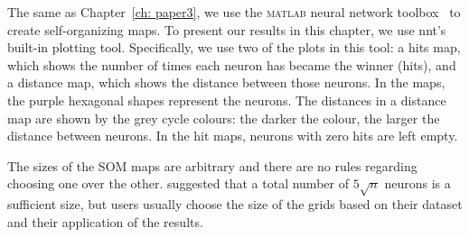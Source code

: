      The same as Chapter~\ref{ch: paper3}, we use the \textsc{matlab} neural network toolbox~\citep[NNT,][]{matlabtolbox} to create self-organizing maps.
     To present our results in this chapter, we use {\sc nnt}'s built-in plotting tool.
     Specifically, we use two of the plots in this tool: a hits map, which shows the number of times each neuron has became the winner (hits), and a distance map, which shows the distance between those neurons.
     In the maps, the purple hexagonal shapes represent the neurons. 
     The distances in a distance map are shown by the grey cycle colours:
     the darker the colour, the larger the distance between neurons.
     In the hit maps, neurons with zero hits are left empty.

       
    The sizes of the SOM maps are arbitrary and there are no rules regarding choosing one over the other. 
    \citet{Vesanto05} suggested that a total number of $5\sqrt{n}$ neurons is a sufficient size, but users usually choose the size of the grids based on their dataset and their application of the results.

   
 
 
